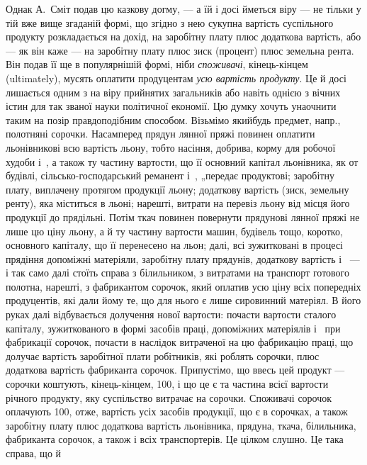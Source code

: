 Однак А.~Сміт подав цю казкову догму, — а їй і досі йметься
віру — не тільки у тій вже вище згаданій формі, що згідно з нею сукупна
вартість суспільного продукту розкладається на дохід, на заробітну
плату плюс додаткова вартість, або — як він каже — на заробітну плату
плюс зиск (процент) плюс земельна рента. Він подав її ще в популярнішій
формі, ніби \emph{споживачі}, кінець-кінцем (ultimately), мусять оплатити
продуцентам \emph{усю вартість продукту}. Це й досі лишається
одним з на віру прийнятих загальників або навіть однією з вічних істин
для так званої науки політичної економії. Цю думку хочуть унаочнити таким
на позір правдоподібним способом. Візьмімо якийбудь предмет, напр.,
полотняні сорочки. Насамперед прядун лянної пряжі повинен оплатити
льонівникові всю вартість льону, тобто насіння, добрива, корму для робочої
худоби і~, а також ту частину вартости, що її основний
капітал льонівника, як от будівлі, сільсько-господарський реманент і~,
„передає продуктові; заробітну плату, виплачену протягом продукції
льону; додаткову вартість (зиск, земельну ренту), яка міститься в льоні;
нарешті, витрати на перевіз льону від місця його продукції до прядільні.
Потім ткач повинен повернути прядунові лянної пряжі не лише цю
ціну льону, а й ту частину вартости машин, будівель тощо, коротко,
основного капіталу, що її перенесено на льон; далі, всі зужитковані
в процесі прядіння допоміжні матеріяли, заробітну плату прядунів, додаткову
вартість і~ — і так само далі стоїть справа з білильником, з витратами
на транспорт готового полотна, нарешті, з фабрикантом сорочок,
який оплатив усю ціну всіх попередніх продуцентів, які дали йому те,
що для нього є лише сировинний матеріял. В його руках далі відбувається
долучення нової вартости: почасти вартости сталого капіталу, зужиткованого
в формі засобів праці, допоміжних матеріялів і~ при фабрикації
сорочок, почасти в наслідок витраченої на цю фабрикацію праці,
що долучає вартість заробітної плати робітників, які роблять сорочки,
плюс додаткова вартість фабриканта сорочок. Припустімо, що ввесь цей
продукт — сорочки коштують, кінець-кінцем, 100, і що це є
та частина всієї вартости річного продукту, яку суспільство витрачає на
сорочки. Споживачі сорочок оплачують 100, отже, вартість усіх
засобів продукції, що є в сорочках, а також заробітну плату плюс додаткова
вартість льонівника, прядуна, ткача, білильника, фабриканта сорочок,
а також і всіх транспортерів. Це цілком слушно. Це така справа, що й
